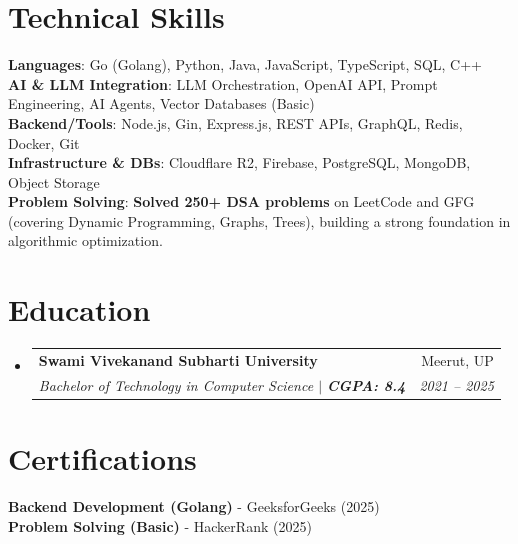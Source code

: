 \documentclass[letterpaper,11pt]{article}
\makeatletter
\newcommand{\resumeSubheading}[4]{
  \vspace{-2pt}\item
    \begin{tabular*}{0.97\textwidth}[t]{l@{\extracolsep{\fill}}r}
      \textbf{#1} & #2 \\
      \textit{\small#3} & \textit{\small #4} \\
    \end{tabular*}\vspace{-11pt}
}
\newcommand{\resumeSubHeadingListStart}{\begin{itemize}[leftmargin=0.15in, label={}]}
\newcommand{\resumeSubHeadingListEnd}{\end{itemize}}
\makeatother
\begin{document}
\section{Technical Skills}
 \begin{itemize}[leftmargin=0.15in, label={}]
    \small{\item{
     \textbf{Languages}{: Go (Golang), Python, Java, JavaScript, TypeScript, SQL, C++} \\
     \textbf{AI \& LLM Integration}{: LLM Orchestration, OpenAI API, Prompt Engineering, AI Agents, Vector Databases (Basic)} \\
     \textbf{Backend/Tools}{: Node.js, Gin, Express.js, REST APIs, GraphQL, Redis, Docker, Git} \\
     \textbf{Infrastructure \& DBs}{: Cloudflare R2, Firebase, PostgreSQL, MongoDB, Object Storage} \\
     \textbf{Problem Solving}{: \textbf{Solved 250+ DSA problems} on LeetCode and GFG (covering Dynamic Programming, Graphs, Trees), building a strong foundation in algorithmic optimization.}
    }}
 \end{itemize}


\section{Education}
  \resumeSubHeadingListStart
    \resumeSubheading
      {Swami Vivekanand Subharti University}{Meerut, UP}
      {Bachelor of Technology in Computer Science $|$ \textbf{CGPA: 8.4}}{2021 -- 2025}
  \resumeSubHeadingListEnd


\section{Certifications}
 \begin{itemize}[leftmargin=0.15in, label={}]
    \small{\item{
     \textbf{Backend Development (Golang)} - GeeksforGeeks (2025) \\
     \textbf{Problem Solving (Basic)} - HackerRank (2025)
    }}
 \end{itemize}
\end{document}
